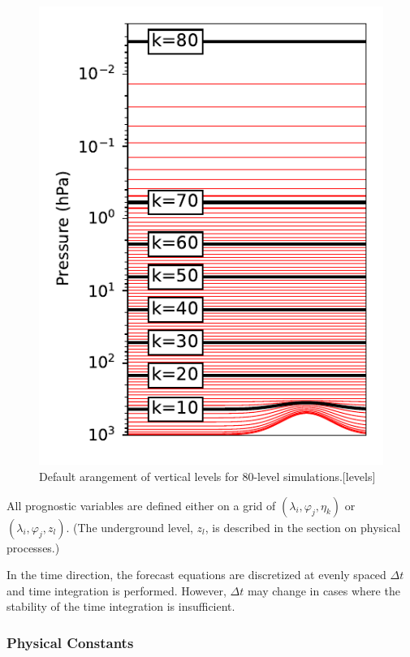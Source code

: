 \begin{figure}
\hypertarget{levels}{%
\centering
\includegraphics{./figures/levels.pdf}
\caption{Default arangement of vertical levels for 80-level simulations.\protect\hypertarget{levels}{}{{[}levels{]}}}\label{levels}
}
\end{figure}

All prognostic variables are defined either on a grid of \((\lambda_i, \varphi_j, \eta_k)\) or \((\lambda_i, \varphi_j, z_l)\). (The underground level, \(z_l\), is described in the section on physical
processes.)

In the time direction, the forecast equations are discretized at evenly spaced \(\Delta t\) and time integration is performed. However, \(\Delta t\) may change in cases where the stability of the time
integration is insufficient.

\hypertarget{physical-constants}{%
\subsubsection{Physical Constants}\label{physical-constants}}


